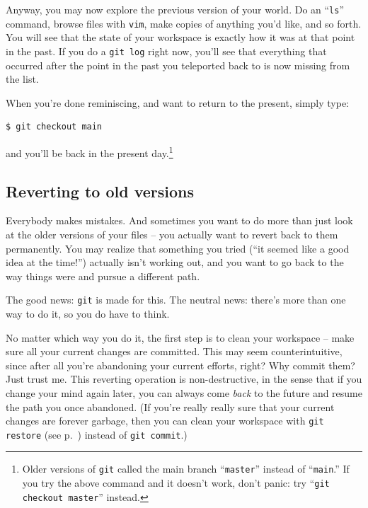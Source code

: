 Anyway, you may now explore the previous version of your world. Do an
``\texttt{ls}'' command, browse files with \texttt{vim}, make copies of
anything you'd like, and so forth. You will see that the state of your
workspace is exactly how it was at that point in the past. If you do a
\texttt{git log} right now, you'll see that everything that occurred after the
point in the past you teleported back to is now missing from the list.

When you're done reminiscing, and want to return to the present, simply type:

\begin{Verbatim}[fontsize=\small,samepage=true,frame=none]
$ git checkout main
\end{Verbatim}

and you'll be back in the present day.\footnote{Older versions of \texttt{git}
called the main branch ``\texttt{master}'' instead of ``\texttt{main}.'' If you
try the above command and it doesn't work, don't panic: try ``\texttt{git
checkout master}'' instead.}

\subsection{Reverting to old versions}

Everybody makes mistakes. And sometimes you want to do more than just look at
the older versions of your files -- you actually want to revert back to them
permanently. You may realize that something you tried (``it seemed like a good
idea at the time!'') actually isn't working out, and you want to go back to the
way things were and pursue a different path.

The good news: \texttt{git} is made for this. The neutral news: there's more
than one way to do it, so you do have to think.


No matter which way you do it, the first step is to clean your workspace --
make sure all your current changes are committed. This may seem
counterintuitive, since after all you're abandoning your current efforts,
right? Why commit them? Just trust me. This reverting operation is
non-destructive, in the sense that if you change your mind again later, you can
always come \textit{back} to the future and resume the path you once abandoned.
(If you're really really sure that your current changes are forever garbage,
then you can clean your workspace with \texttt{git restore} (see
p.~\pageref{gitRestore}) instead of \texttt{git commit}.)

